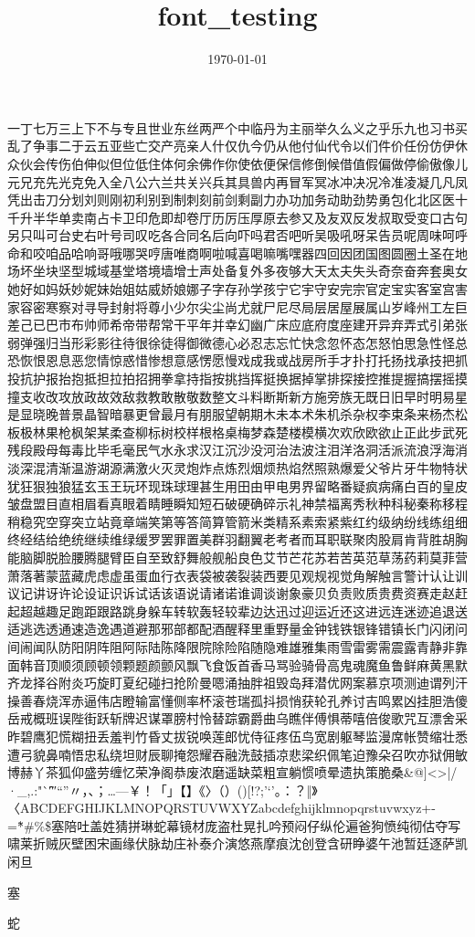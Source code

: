\documentclass[30pt]{article}
\title{font_testing}
\date{\today}
\begin{document}
 一丁七万三上下不与专且世业东丝两严个中临丹为主丽举久么义之乎乐九也习书买乱了争事二于云五亚些亡交产亮亲人什仅仇今仍从他付仙代令以们件价任份仿伊休众伙会传伤伯伸似但位低住体何余佛作你使依便保信修倒候借值假偏做停偷傲像儿元兄充先光克免入全八公六兰共关兴兵其具兽内再冒军冥冰冲决况冷准凌凝几凡凤凭出击刀分划刘则刚初利别到制刺刻前剑剩副力办功加务动助劲势勇包化北区医十千升半华单卖南占卡卫印危即却卷厅历厉压厚原去参又及友双反发叔取受变口古句另只叫可台史右叶号司叹吃各合同名后向吓吗君否吧听吴吸吼呀呆告员呢周味呵呼命和咬咱品哈响哥哦哪哭哼唐唯商啊啦喊喜喝嘛嘴嘿器四回因团国图圆圈土圣在地场坏坐块坚型城域基堂塔境墙增士声处备复外多夜够大天太夫失头奇奈奋奔套奥女她好如妈妖妙妮妹始姐姑威娇娘娜子字存孙学孩宁它宇守安完宗官定宝实客室宫害家容密寒察对寻导封射将尊小少尔尖尘尚尤就尸尼尽局层居屋展属山岁峰州工左巨差己已巴市布帅师希帝带帮常干平年并幸幻幽广床应底府度座建开异弃弄式引弟张弱弹强归当形彩影往待很徐徒得御微德心必忍志忘忙快念忽怀态怎怒怕思急性怪总恐恢恨恩息恶您情惊惑惜惨想意感愣愿慢戏成我或战房所手才扑打托扬找承技把抓投抗护报抬抱抵担拉拍招拥拳拿持指按挑挡挥挺换据掉掌排探接控推提握搞摆摇摸撞支收改攻放政故效敌救教敢散敬数整文斗料断斯新方施旁族无既日旧早时明易星是显晓晚普景晶智暗暴更曾最月有朋服望朝期木未本术朱机杀杂权李束条来杨杰松板极林果枪枫架某柔查柳标树校样根格桌梅梦森楚楼模横次欢欣欧欲止正此步武死残段殿母每毒比毕毛毫民气水永求汉江沉沙没河治法波注泪洋洛洞活派流浪浮海消淡深混清渐温游湖源满激火灭灵炮炸点炼烈烟烦热焰然照熟爆爱父爷片牙牛物特状犹狂狠独狼猛玄玉王玩环现珠球理甚生用田由甲电男界留略番疑疯病痛白百的皇皮皱盘盟目直相眉看真眼着睛睡瞬知短石破硬确碎示礼神禁福离秀秋种科秘秦称移程稍稳究空穿突立站竟章端笑第等答简算管箭米类精系素索紧紫红约级纳纷线练组细终经结给绝统继续维绿缓罗罢罪置美群羽翻翼老考者而耳职联聚肉股肩肯背胜胡胸能脑脚脱脸腰腾腿臂臣自至致舒舞般舰船良色艾节芒花苏若苦英范草荡药莉莫菲营萧落著蒙蓝藏虎虑虚虽蛋血行衣表袋被袭裂装西要见观规视觉角解触言警计认让训议记讲讶许论设证识诉试话该语说请诸诺谁调谈谢象豪贝负责败质贵费资赛走赵赶起超越趣足跑距跟路跳身躲车转软轰轻较辈边达迅过迎运近还这进远连迷迹追退送适逃选透通速造逸遇道避那邪部都配酒醒释里重野量金钟钱铁银锋错镇长门闪闭问间闹闻队防阳阴阵阻阿际陆陈降限院除险陷随隐难雄雅集雨雪雷雾需震露青静非靠面韩音顶顺须顾顿领颗题颜颤风飘飞食饭首香马骂验骑骨高鬼魂魔鱼鲁鲜麻黄黑默齐龙择谷附炎巧旋盯夏纪碰扫抢阶曼嗯涌抽胖祖毁岛拜潜优网案慕京项测迪谓列汗操善春烧浑赤逼伟店瞪输富懂侧率杯滚苍瑞孤抖损悄获轮孔养讨吉鸣累凶挂胆浩傻岳戒概班误陛街跃斩牌迟谋罩膀村怜替踪霸爵曲乌瞧伴傅惧蒂嘻倍俊歌咒互漂舍采昨碧鹰犯慌糊扭丢羞判竹昏丈拔锐唤莲郎忧侍征疼伍鸟宽剧躯琴监漫席帐赞缩壮悉遭弓貌鼻喃悟忠私绕坦财辰聊掩怨耀吞融洗鼓插凉悲梁织佩笔迫豫朵召吹亦狱佣敏博赫丫茶狐仰盛劳缠忆荣净阁恭废浓磨遥缺菜粗宣躺惯喷晕遗执策脆桑\&@{}]<>|/·\_,.:"`\^′″“”〃，、；…—￥！「」【】《〉（）()[!?;'‘’。：？‖》〈ABCDEFGHIJKLMNOPQRSTUVWXYZabcdefghijklmnopqrstuvwxyz+- =\~*#\%\$塞陪吐盖姓猜拼琳蛇幕镜材庞盗杜晃扎吟预闷仔纵伦遍爸狗愤纯彻估夺写啸莱折贼灰壁困宋画缘伏脉劫庄补泰介演悠燕摩痕沈创登含研睁婆午池暂廷逐萨凯闲旦

塞

蛇
\end{document}
